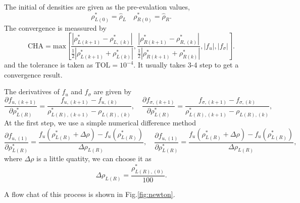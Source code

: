 \documentclass[review]{elsarticle}
\begin{document}
The initial of densities are given as the pre-evalation values,
\begin{equation}
  \rho_{L(0)}^* = \hat{\rho}_L \quad \rho_{R(0)}^* = \hat{\rho}_R.
\end{equation}
The  convergence is meassured by 
\begin{equation}
\text{CHA} = \text{max} \left[  
\frac{|\rho_{L(k+1)}^*- \rho_{L,(k)}^*|}{\frac{1}{2}|\rho_{L(k+1)}^*+\rho_{L(k)}^*|},   \frac{|\rho_{R(k+1)}^*- \rho_{R,(k)}^*|}{\frac{1}{2}|\rho_{R(k+1)}^*+\rho_{R(k)}^*|},|f_{u}|,|f_{\sigma}|\right].
\end{equation}
and the tolerance is taken as $\text{TOL} = 10^{-4}$. It usually takes 3-4 step to get a convergence result.

The derivatives of $f_{u}$ and $f_{\sigma}$ are given by
\begin{equation}
  \frac{\partial f_{u,(k+1)}}{\partial \rho^*_{L(R)}} = \frac{f_{u,(k+1)}-f_{u,(k)}}{\rho_{L(R),(k+1)}^* - \rho_{L(R),(k)}},\quad
  \frac{\partial f_{\sigma,(k+1)}}{\partial \rho^*_{L(R)}} = \frac{f_{\sigma,(k+1)}-f_{\sigma,(k)}}{\rho_{L(R),(k+1)}^* - \rho_{L(R),(k)}},
\end{equation}
At the first step, we use a simple  numerical difference  method
\begin{equation}
  \frac{\partial f_{u,(1)}}{\partial \rho^*_{L(R)}} = \frac{f_{u}(\rho^*_{L(R)}+\Delta \rho)-f_{u}(\rho^*_{L(R)})}{\Delta \rho_{L(R)}},\quad
  \frac{\partial f_{u,(1)}}{\partial \rho^*_{L(R)}} = \frac{f_{u}(\rho^*_{L(R)}+\Delta \rho)-f_{u}(\rho^*_{L(R)})}{\Delta \rho_{L(R)}},
\end{equation}
where $\Delta \rho$ is a little quatity, we can choose it as
\begin{equation}
  \Delta \rho_{L(R)} = \frac{\rho_{L(R),(0)}^*}{100}.
\end{equation}

A flow chat of this process is shown in Fig.\ref{fig:newton}.
\end{document}
